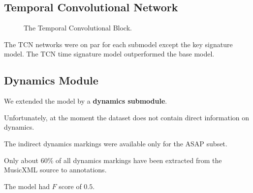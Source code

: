 \documentclass[a4paper, 9pt]{beamer}
\begin{document}
\subsection{Temporal Convolutional Network}

\begin{frame}
\begin{figure}[ht!]
\centering
\resizebox{!}{0.8\textheight}{}
\caption[The Temporal Convolutional Block.]{The Temporal Convolutional Block.}
\label{temporal_convolutional_network}
\end{figure}
\end{frame}

\begin{frame}
The TCN networks were on par for each submodel except the key signature model. The TCN time signature model outperformed the base model.
\end{frame}

\subsection{Dynamics Module}

\begin{frame}
We extended the model by a \textbf{dynamics submodule}.\pause

Unfortunately, at the moment the dataset does not contain direct information on dynamics.\pause

The indirect dynamics markings were available only for the ASAP subset.\pause

Only about $60\%$ of all dynamics markings have been extracted from the MusicXML source to annotations.\pause

The model had $F$ score of $0.5$.
\end{frame}

\begin{frame}[allowframebreaks]

\end{frame}
\end{document}

